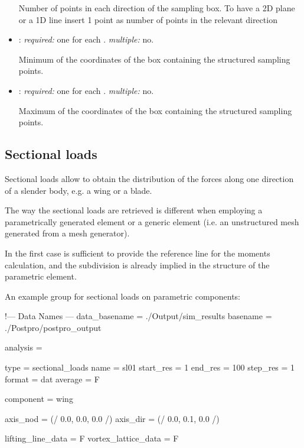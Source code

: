 \begin{itemize}
Number of points in each direction of the sampling box. To have a 2D plane or a 1D 
line insert 1 point as number of points in the relevant direction

\item {}: \textit{required:} one for each . 
\textit{multiple:} no.

Minimum of the coordinates of the box containing the structured sampling points.

\item {}: \textit{required:} one for each . 
\textit{multiple:} no.

Maximum of the coordinates of the box containing the structured sampling points.

\end{itemize}

\subsection{Sectional loads}

Sectional loads allow to obtain the distribution of the forces along one 
direction of a slender body, e.g. a wing or a blade. 

The way the sectional loads are retrieved is different when employing a 
parametrically generated element or a generic element 
(i.e. an unstructured mesh generated from a mesh generator). 

In the first case is sufficient to provide the reference line for the 
moments calculation, and the subdivision is already implied in the structure 
of the parametric element. 

An example  group for sectional loads on parametric components:

\begin{inputfile}[frame=single, caption={dust\_post.in for sectional load 
  on parametric components}, label={file:dust_post.in_sectional_param}]
!--- Data Names ---
data_basename = ./Output/sim_results
basename =     ./Postpro/postpro_output

analysis = {

type = sectional_loads
name = sl01
start_res = 1
end_res   = 100 
step_res  = 1
format = dat
average = F

component = wing

axis_nod = (/ 0.0, 0.0, 0.0 /)
axis_dir = (/ 0.0, 0.1, 0.0 /)

lifting_line_data = F
vortex_lattice_data = F
}
\end{inputfile}

